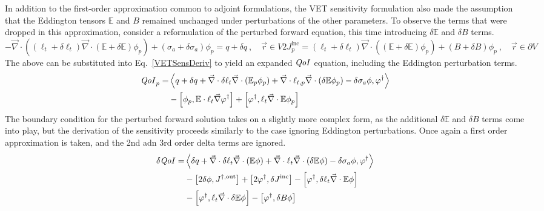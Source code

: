 \documentclass[12pt]{report}
\newcommand{\vr}{\vec{r}}
\newcommand{\bra}{\left\langle}
\newcommand{\ket}{\right\rangle}
\newcommand{\sbra}{\left[}
\newcommand{\sket}{\right]}
\renewcommand{\div}{\vec{\nabla} \cdot}
\newcommand{\grad}{\vec{\nabla}}
\newcommand{\vefadj}{\varphi^\dag}
\newcommand{\Edd}{\mathbb{E}}
\newcommand{\BEdd}{B}
\newcommand{\siga}{\sigma_a}
\newcommand{\isigt}{\ell_t}
\newcommand{\scalSource}{q}
\newcommand{\qoi}{{\it QoI}\xspace}
\begin{document}
In addition to the first-order approximation common to adjoint formulations, the VET sensitivity formulation also made the assumption that the Eddington tensors $\Edd$ and $B$ remained unchanged under perturbations of the other parameters. To observe the terms that were dropped in this approximation, consider a reformulation of the perturbed forward equation, this time introducing $\delta \Edd$ and $\delta  B$ terms. 
\begin{subequations}
\begin{equation}
\label{VEFPerEdd}
- \div \left((\isigt + \delta \isigt)\div (\Edd + \delta \Edd) \phi_p \right) + (\siga + \delta \siga)\phi_p = \scalSource + \delta \scalSource \ , \quad \vr \in V
\end{equation}
\begin{equation}
2J_p^{\text{inc}} =
(\isigt + \delta \isigt) \vec{\nabla} \cdot \left((\Edd + \delta \Edd) \phi_p \right)  + (\BEdd +\delta \BEdd) \phi_p \ ,\quad \vr \in \partial V
\end{equation}
\end{subequations}
The above can be substituted into Eq.~\eqref{VETSensDeriv} to yield an expanded $\qoi$ equation, including the Eddington perturbation terms. 
\begin{equation}
\label{QoIVETAdjNoBCEdd}
\begin{split}
\qoi_p = & \bra \scalSource + \delta \scalSource + \div \delta \isigt \div \left( \Edd_p \phi_p \right) + \div \ell_{t,p} \div \left( \delta \Edd \phi_p \right) - \delta \siga \phi, \vefadj \ket \\
&- \sbra \phi_p, \Edd \cdot \isigt \grad \vefadj \sket 
+ \sbra \vefadj , \isigt \div \Edd \phi_p \sket
\end{split}
\end{equation}
The boundary condition for the perturbed forward solution takes on a slightly more complex form, as the additional $\delta \Edd$ and $\delta \BEdd$ terms come into play, but the derivation of the sensitivity proceeds similarly to the case ignoring Eddington perturbations. Once again a first order approximation is taken, and the 2nd adn 3rd order delta terms are ignored.
\begin{equation}
\label{QoIVETAdjEdd}
\begin{split}
\delta \qoi =& \bra \delta \scalSource + \div \delta \isigt \div \left( \Edd \phi \right) + \div \isigt \div \left( \delta \Edd \phi \right) - \delta \siga \phi, \vefadj \ket \\
&- \sbra 2\delta \phi, J^{\dag, \text{out}} \sket  + \sbra 2 \vefadj, \delta J^{\text{inc}} \sket
- \sbra \vefadj, \delta \isigt \div \Edd \phi \sket
\\
&- \sbra  \vefadj ,\isigt \div \delta \Edd \phi \sket
- \sbra \vefadj, \delta \BEdd \phi \sket
\end{split}
\end{equation} 
\end{document}
